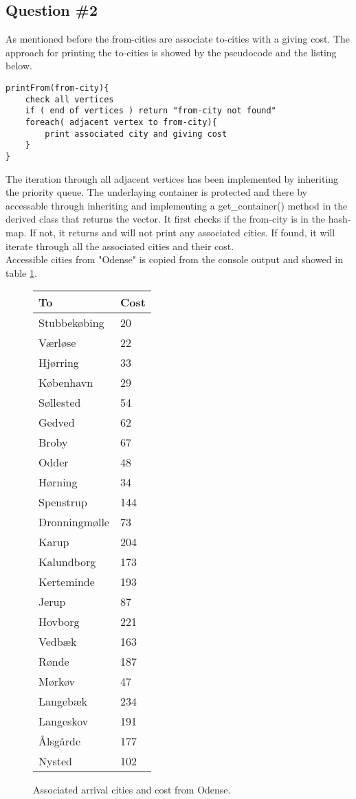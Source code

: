 \subsection{Question \#2}
As mentioned before the from-cities are associate to-cities with a giving cost. The approach for printing the to-cities is showed by the pseudocode and the listing below. 
\bigskip
\begin{lstlisting}
printFrom(from-city){
	check all vertices 
	if ( end of vertices ) return "from-city not found"
	foreach( adjacent vertex to from-city){
	    print associated city and giving cost
    }
}
\end{lstlisting}
The iteration through all adjacent vertices has been implemented by inheriting the priority queue. The underlaying container is protected and there by accessable through inheriting and implementing a get\_container() method in the derived class that returns the vector.
\bigskip
It first checks if the from-city is in the hash-map. If not, it returns and will not print any associated cities. If found, it will iterate through all the associated cities and their cost.\\
Accessible cities from "Odense" is copied from the console output and showed in table \ref{tb:fromodense}. 
\begin{figure}[th!]
\centering
\begin{tabular}{l|l}
To &Cost\\\hline
Stubbekøbing & 20\\
Værløse & 22\\
Hjørring & 33\\
København & 29\\
Søllested & 54\\
Gedved & 62\\
Broby & 67\\
Odder & 48\\
Hørning & 34\\
Spenstrup & 144\\
Dronningmølle & 73\\
Karup & 204\\
Kalundborg & 173\\
Kerteminde & 193\\
Jerup & 87\\
Hovborg & 221\\
Vedbæk & 163\\
Rønde & 187\\
Mørkøv & 47\\
Langebæk & 234\\
Langeskov & 191\\
Ålsgårde & 177\\
Nysted & 102\\
\end{tabular}
\captionsetup{type=table}
\caption[tekst i indholdsfortegnelsen]{Associated arrival cities and cost from Odense.}
\label{tb:fromodense}
\end{figure}

